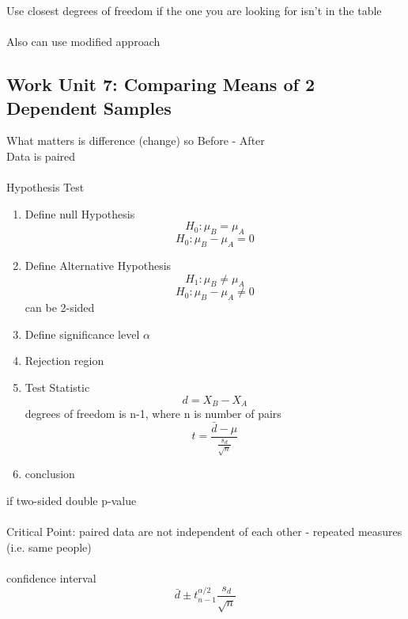 \documentclass[a4paper,10pt]{article}
\begin{document}
Use closest degrees of freedom if the one you are looking for isn't in the table \\ \\ Also can use modified approach

\subsection{Work Unit 7: Comparing Means of 2 Dependent Samples}

What matters is difference (change) so Before - After \\ Data is paired
\\ \\
Hypothesis Test
\begin{enumerate}
	\item Define null Hypothesis \[H_0: \mu_B = \mu_A\] \[H_0: \mu_B - \mu_A = 0\]
	\item Define Alternative Hypothesis \[H_1: \mu_B \neq \mu_A\] \[H_0: \mu_B - \mu_A \neq 0\] can be 2-sided
	\item Define significance level $\alpha$
	\item Rejection region 
	\item Test Statistic \[d = X_B - X_A\] degrees of freedom is n-1, where n is number of pairs \[ t = \frac{\bar{d}-\mu}{\frac{s_d}{\sqrt{n}}}\]
	\item conclusion
\end{enumerate}

if two-sided double p-value \\ \\ Critical Point: paired data are not independent of each other - repeated measures (i.e. same people) \\ \\
confidence interval
\[
	\bar{d} \pm t^{\alpha/2}_{n-1}\frac{s_d}{\sqrt{n}}
\]

\end{document}

